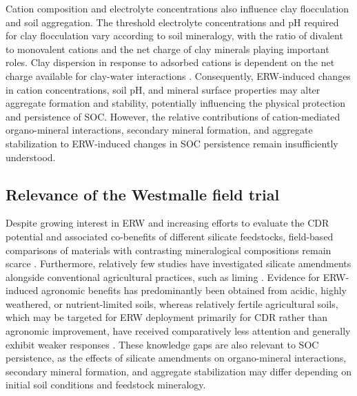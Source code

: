 \documentclass[preprint,12pt]{elsarticle}
\begin{document}
Cation composition and electrolyte concentrations also influence clay flocculation and soil aggregation. The threshold electrolyte concentrations and pH required for clay flocculation vary according to soil mineralogy, with the ratio of divalent to monovalent cations and the net charge of clay minerals playing important roles. Clay dispersion in response to adsorbed cations is dependent on the net charge available for clay-water interactions \citep{marchuk2013influence}. Consequently, ERW-induced changes in cation concentrations, soil pH, and mineral surface properties may alter aggregate formation and stability, potentially influencing the physical protection and persistence of SOC. However, the relative contributions of cation-mediated organo-mineral interactions, secondary mineral formation, and aggregate stabilization to ERW-induced changes in SOC persistence remain insufficiently understood.

\subsection{Relevance of the Westmalle field trial}

Despite growing interest in ERW and increasing efforts to evaluate the CDR potential and associated co-benefits of different silicate feedstocks, field-based comparisons of materials with contrasting mineralogical compositions remain scarce \citep{steinwidder2025beyond, tePas2023}. Furthermore, relatively few studies have investigated silicate amendments alongside conventional agricultural practices, such as liming \citep{Araujo2024,Buckingham2024,Dietzen2018}. Evidence for ERW-induced agronomic benefits has predominantly been obtained from acidic, highly weathered, or nutrient-limited soils, whereas relatively fertile agricultural soils, which may be targeted for ERW deployment primarily for CDR rather than agronomic improvement, have received comparatively less attention and generally exhibit weaker responses \citep{Swoboda2022,VanStraaten2002}. These knowledge gaps are also relevant to SOC persistence, as the effects of silicate amendments on organo-mineral interactions, secondary mineral formation, and aggregate stabilization may differ depending on initial soil conditions and feedstock mineralogy.
\end{document}
